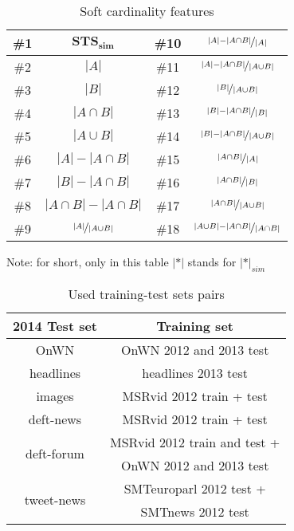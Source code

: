 \begin{table}
\begin{centering}
\begin{tabular}{|c|c|c|c|}
\hline 
{\footnotesize \#1} & $\mathbf{STS_{sim}}$ & {\footnotesize \#10} & $\nicefrac{|A|-|A\cap B|}{|A|}$\tabularnewline
\hline 
{\footnotesize \#2} & {\small $|A|$} & {\footnotesize \#11} & $\nicefrac{|A|-|A\cap B|}{|A\cup B|}$\tabularnewline
\hline 
{\footnotesize \#3} & {\small $|B|$} & {\footnotesize \#12} & $\nicefrac{|B|}{|A\cup B|}$\tabularnewline
\hline 
{\footnotesize \#4} & {\small $|A\cap B|$} & {\footnotesize \#13} & $\nicefrac{|B|-|A\cap B|}{|B|}$\tabularnewline
\hline 
{\footnotesize \#5} & {\small $|A\cup B|$} & {\footnotesize \#14} & $\nicefrac{|B|-|A\cap B|}{|A\cup B|}$\tabularnewline
\hline 
{\footnotesize \#6} & {\small $|A|-|A\cap B|$} & {\footnotesize \#15} & $\nicefrac{|A\cap B|}{|A|}$\tabularnewline
\hline 
{\footnotesize \#7} & {\small $|B|-|A\cap B|$} & {\footnotesize \#16} & $\nicefrac{|A\cap B|}{|B|}$\tabularnewline
\hline 
{\footnotesize \#8} & {\small $|A\cap B|-|A\cap B|$} & {\footnotesize \#17} & $\nicefrac{|A\cap B|}{|A\cup B|}$\tabularnewline
\hline 
{\footnotesize \#9} & $\nicefrac{|A|}{|A\cup B|}$ & {\footnotesize \#18} & $\nicefrac{|A\cup B|-|A\cap B|}{|A\cap B|}$\tabularnewline
\hline 
\end{tabular}
\par\end{centering}

\begin{centering}
Note: for short, only in this table $|*|$ stands for $|*|_{sim}$
\par\end{centering}

\caption{Soft cardinality features\label{tab:features}}
\end{table}


\begin{table}
\begin{centering}
\begin{tabular}{|c|c|}
\hline 
{\scriptsize 2014 Test set} & {\scriptsize Training set}\tabularnewline
\hline 
\hline 
{\scriptsize OnWN} & {\scriptsize OnWN 2012 and 2013 test}\tabularnewline
\hline 
{\scriptsize headlines} & {\scriptsize headlines 2013 test}\tabularnewline
\hline 
{\scriptsize images} & {\scriptsize MSRvid 2012 train + test}\tabularnewline
\hline 
{\scriptsize deft-news} & {\scriptsize MSRvid 2012 train + test}\tabularnewline
\hline 
\multirow{2}{*}{{\scriptsize deft-forum}} & {\scriptsize MSRvid 2012 train and test +}\tabularnewline
 & {\scriptsize OnWN 2012 and 2013 test}\tabularnewline
\hline 
\multirow{2}{*}{{\scriptsize tweet-news}} & {\scriptsize SMTeuroparl 2012 test +}\tabularnewline
 & {\scriptsize SMTnews 2012 test }\tabularnewline
\hline 
\end{tabular}
\par\end{centering}

\centering{}\caption{Used training-test sets pairs\label{tab:training-test-sets}}
\end{table}


